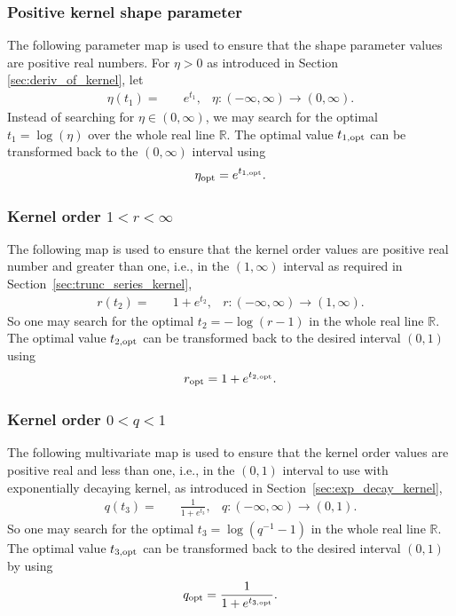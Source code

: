 \documentclass{svjour3}                     %
\newcommand{\reals}{\mathbb{R}}
\newcommand\secref{Section~\ref}
\begin{document}
\subsubsection{Positive kernel shape parameter}
The following parameter map is used to ensure that the shape parameter values are positive real numbers. For $\eta > 0$ as introduced in Section \ref{sec:deriv_of_kernel}, let
\begin{align*}
\eta{(t_1)} = & \quad e^{t_1}, & \eta : (-\infty, \infty) \to (0, \infty).
\end{align*}
Instead of searching for $\eta \in (0, \infty)$, we may search for the optimal $t_1 = \log(\eta)$ over the whole real line $\reals$. 
The optimal value $t_{1, \textup{opt}}$ can be transformed back to the $(0, \infty)$ interval using 
\begin{align*}
\eta_{\textup{opt}} = e^{t_{1,\textup{opt}}}.
\end{align*}



\subsubsection{Kernel order $1 < r < \infty$}
The following map is used to ensure that the kernel order values are positive real number and greater than one, i.e., in the $(1, \infty)$ interval as required in \secref{sec:trunc_series_kernel},
\begin{align*}
r(t_2) = & \quad {1 + e^{t_2}}, & r:  (-\infty, \infty) \to (1,\infty).
\end{align*}
So one may search for the optimal $t_2 = -\log(r-1)$ in the whole real line $\reals$.
The optimal value $t_{2, \textup{opt}}$ can be transformed back to the desired interval $(0,1)$ using 
\begin{align*}
r_{\textup{opt}} = 1+ e^{t_{2, \textup{opt}}}.
\end{align*}





\subsubsection{Kernel order $0 < q < 1$}
The following multivariate map is used to ensure that the kernel order values are positive real and less than one, i.e., in the $(0,1)$ interval to use with exponentially decaying kernel, as introduced in \secref{sec:exp_decay_kernel},
\begin{align*}
q(t_3) = & \quad \frac{1}{1 + e^{t_3}}, & q: (-\infty, \infty) \to (0, 1).
\end{align*}
So one may search for the optimal $t_3 = \log(q^{-1}-1)$ in the whole real line $\reals$.
The optimal value $t_{3, \textup{opt}}$ can be transformed back to the desired interval $(0,1)$ by using
\begin{align*}
q_{\textup{opt}} = \frac{1}{1 + e^{t_{3, \textup{opt}}}}.
\end{align*}
\end{document}

